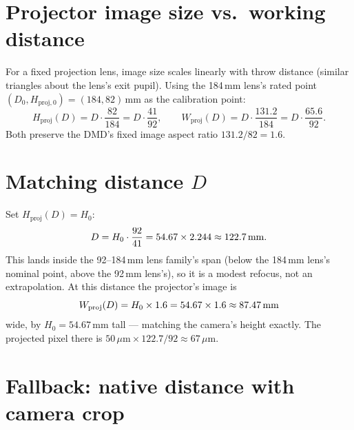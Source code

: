 \documentclass[11pt]{article}
\begin{document}
\section{Projector image size vs.\ working distance}

For a fixed projection lens, image size scales linearly with throw
distance (similar triangles about the lens's exit pupil). Using the
184\,mm lens's rated point $(D_0, H_{\text{proj},0}) = (184, 82)$\,mm as the
calibration point:
\begin{equation}
  H_{\text{proj}}(D) = D \cdot \frac{82}{184} = D \cdot \frac{41}{92},
  \qquad
  W_{\text{proj}}(D) = D \cdot \frac{131.2}{184} = D \cdot \frac{65.6}{92}.
\end{equation}
Both preserve the DMD's fixed image aspect ratio
$131.2/82 = 1.6$.

\section{Matching distance \texorpdfstring{$D$}{D}}

Set $H_{\text{proj}}(D) = H_0$:
\begin{equation}
  D = H_0 \cdot \frac{92}{41} = 54.67 \times 2.244 \approx 122.7\text{\,mm}.
\end{equation}
This lands inside the 92--184\,mm lens family's span (below the 184\,mm
lens's nominal point, above the 92\,mm lens's), so it is a modest refocus,
not an extrapolation. At this distance the projector's image is
\begin{equation}
  W_{\text{proj}}(D) = H_0 \times 1.6 = 54.67 \times 1.6 \approx 87.47\text{\,mm}
\end{equation}
wide, by $H_0 = 54.67$\,mm tall --- matching the camera's height exactly.
The projected pixel there is $50\,\mu\text{m}\times 122.7/92 \approx 67\,\mu$m.

\section{Fallback: native distance with camera crop}
\label{sec:crop}
\end{document}
